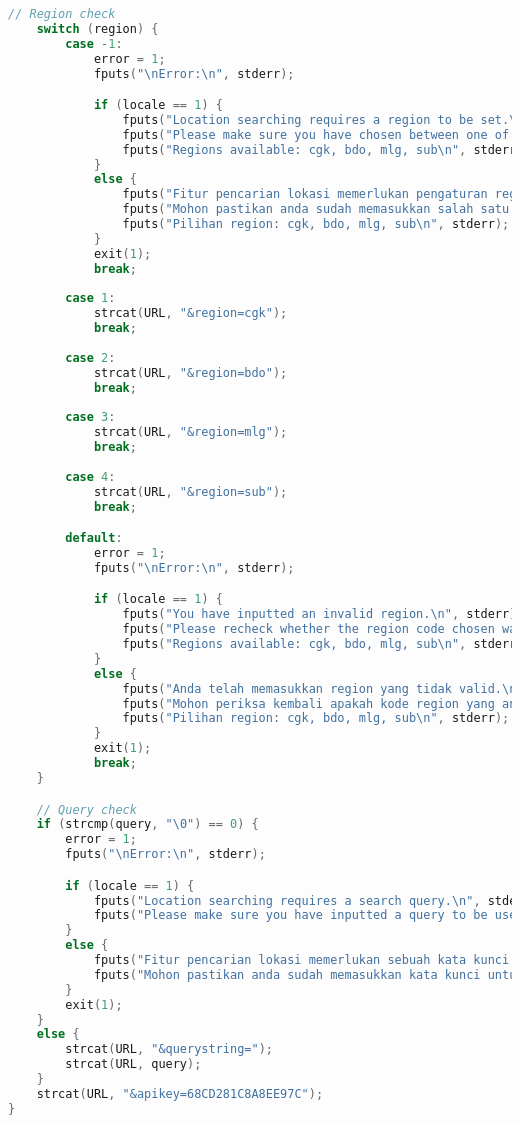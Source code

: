 \begin{itemize}[listparindent=\parindent]
\begin{lstlisting}[language=C, caption=Implementasi fungsi build\textunderscore url\textunderscore searchplace(), label=code:kiritool-function-buildurl-searchplace]
    // Region check
    switch (region) {
        case -1:
            error = 1;
            fputs("\nError:\n", stderr);

            if (locale == 1) {
                fputs("Location searching requires a region to be set.\n", stderr);
                fputs("Please make sure you have chosen between one of the four available regions.\n", stderr);
                fputs("Regions available: cgk, bdo, mlg, sub\n", stderr);
            }
            else {
                fputs("Fitur pencarian lokasi memerlukan pengaturan region lokasi yang ingin dicari.\n", stderr);
                fputs("Mohon pastikan anda sudah memasukkan salah satu dari empat kode region yang tersedia.\n", stderr);
                fputs("Pilihan region: cgk, bdo, mlg, sub\n", stderr);
            }
            exit(1);
            break;
        
        case 1:
            strcat(URL, "&region=cgk");
            break;
        
        case 2:
            strcat(URL, "&region=bdo");
            break;
        
        case 3:
            strcat(URL, "&region=mlg");
            break;
        
        case 4:
            strcat(URL, "&region=sub");
            break;

        default:
            error = 1;
            fputs("\nError:\n", stderr);

            if (locale == 1) {
                fputs("You have inputted an invalid region.\n", stderr);
                fputs("Please recheck whether the region code chosen was one of the four region codes supported.\n", stderr);
                fputs("Regions available: cgk, bdo, mlg, sub\n", stderr);
            }
            else {
                fputs("Anda telah memasukkan region yang tidak valid.\n", stderr);
                fputs("Mohon periksa kembali apakah kode region yang anda masukkan merupakan salah satu dari empat kode region yang tersedia.\n", stderr);
                fputs("Pilihan region: cgk, bdo, mlg, sub\n", stderr);
            }
            exit(1);
            break;
    }

    // Query check
    if (strcmp(query, "\0") == 0) {
        error = 1;
        fputs("\nError:\n", stderr);

        if (locale == 1) {
            fputs("Location searching requires a search query.\n", stderr);
            fputs("Please make sure you have inputted a query to be used in the search.\n", stderr);
        }
        else {
            fputs("Fitur pencarian lokasi memerlukan sebuah kata kunci pencarian.\n", stderr);
            fputs("Mohon pastikan anda sudah memasukkan kata kunci untuk melakukan pencarian lokasi.\n", stderr);
        }
        exit(1);
    }
    else {
        strcat(URL, "&querystring=");
        strcat(URL, query);
    }
    strcat(URL, "&apikey=68CD281C8A8EE97C");
}
	\end{lstlisting}
	

\end{itemize}

